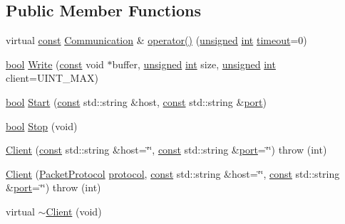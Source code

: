 \subsection*{Public Member Functions}
\begin{DoxyCompactItemize}
\item 
virtual \hyperlink{term__entry_8h_a57bd63ce7f9a353488880e3de6692d5a}{const} \hyperlink{namespacebpt_1_1_net_com_af30d27373a967c6e6bcbf97963e2ab1d}{Communication} \& \hyperlink{classbpt_1_1_net_com_1_1_client_ac1ed443aee7aa7c4c434b0cd5ed26c1b}{operator()} (\hyperlink{curses_8priv_8h_aca40206900cfc164654362fa8d4ad1e6}{unsigned} \hyperlink{term__entry_8h_ad65b480f8c8270356b45a9890f6499ae}{int} \hyperlink{_ndk_8cpp_a174cf046f3b5dbb1258515b3f138b8c7}{timeout}=0)
\item 
\hyperlink{term__entry_8h_a002004ba5d663f149f6c38064926abac}{bool} \hyperlink{classbpt_1_1_net_com_1_1_client_ae27e9a6765cc0e25a6abaea38a05a4c3}{Write} (\hyperlink{term__entry_8h_a57bd63ce7f9a353488880e3de6692d5a}{const} void $\ast$buffer, \hyperlink{curses_8priv_8h_aca40206900cfc164654362fa8d4ad1e6}{unsigned} \hyperlink{term__entry_8h_ad65b480f8c8270356b45a9890f6499ae}{int} size, \hyperlink{curses_8priv_8h_aca40206900cfc164654362fa8d4ad1e6}{unsigned} \hyperlink{term__entry_8h_ad65b480f8c8270356b45a9890f6499ae}{int} client=U\-I\-N\-T\-\_\-\-M\-A\-X)
\item 
\hyperlink{term__entry_8h_a002004ba5d663f149f6c38064926abac}{bool} \hyperlink{classbpt_1_1_net_com_1_1_client_acfd3008d02a4839aadf47ff3e0ad9d8b}{Start} (\hyperlink{term__entry_8h_a57bd63ce7f9a353488880e3de6692d5a}{const} std\-::string \&host, \hyperlink{term__entry_8h_a57bd63ce7f9a353488880e3de6692d5a}{const} std\-::string \&\hyperlink{classbpt_1_1_net_com_1_1_communicator_a6b6676ed095581315ffc75dd7d9a1ceb}{port})
\item 
\hyperlink{term__entry_8h_a002004ba5d663f149f6c38064926abac}{bool} \hyperlink{classbpt_1_1_net_com_1_1_client_abcdb2b699c881a5885384123434f0441}{Stop} (void)
\item 
\hyperlink{classbpt_1_1_net_com_1_1_client_aaf829171ed1256cafc6499c0152d0ab2}{Client} (\hyperlink{term__entry_8h_a57bd63ce7f9a353488880e3de6692d5a}{const} std\-::string \&host=\char`\"{}\char`\"{}, \hyperlink{term__entry_8h_a57bd63ce7f9a353488880e3de6692d5a}{const} std\-::string \&\hyperlink{classbpt_1_1_net_com_1_1_communicator_a6b6676ed095581315ffc75dd7d9a1ceb}{port}=\char`\"{}\char`\"{})  throw (int)
\item 
\hyperlink{classbpt_1_1_net_com_1_1_client_ace12916401b5b4e341eb6825a0f4b240}{Client} (\hyperlink{namespacebpt_1_1_net_com_ae55ee05019d82af5d3cc17e7e0ebedff}{Packet\-Protocol} \hyperlink{classbpt_1_1_net_com_1_1_communicator_aac1e2e8c0b91c11f347c042e56f46041}{protocol}, \hyperlink{term__entry_8h_a57bd63ce7f9a353488880e3de6692d5a}{const} std\-::string \&host=\char`\"{}\char`\"{}, \hyperlink{term__entry_8h_a57bd63ce7f9a353488880e3de6692d5a}{const} std\-::string \&\hyperlink{classbpt_1_1_net_com_1_1_communicator_a6b6676ed095581315ffc75dd7d9a1ceb}{port}=\char`\"{}\char`\"{})  throw (int)
\item 
virtual \hyperlink{classbpt_1_1_net_com_1_1_client_a472c00b03d911ffecebd3beb9310b491}{$\sim$\-Client} (void)
\end{DoxyCompactItemize}
